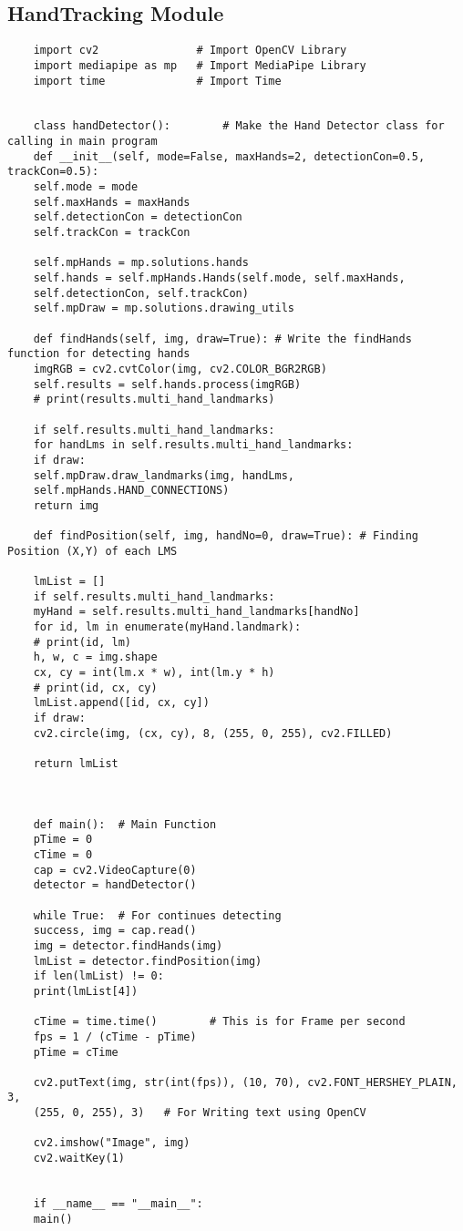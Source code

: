\subsection{HandTracking Module}
\begin{verbatim}
	import cv2               # Import OpenCV Library
	import mediapipe as mp   # Import MediaPipe Library
	import time              # Import Time
	
	
	class handDetector():        # Make the Hand Detector class for calling in main program
	def __init__(self, mode=False, maxHands=2, detectionCon=0.5, trackCon=0.5):
	self.mode = mode
	self.maxHands = maxHands
	self.detectionCon = detectionCon
	self.trackCon = trackCon
	
	self.mpHands = mp.solutions.hands
	self.hands = self.mpHands.Hands(self.mode, self.maxHands,
	self.detectionCon, self.trackCon)
	self.mpDraw = mp.solutions.drawing_utils
	
	def findHands(self, img, draw=True): # Write the findHands function for detecting hands
	imgRGB = cv2.cvtColor(img, cv2.COLOR_BGR2RGB)
	self.results = self.hands.process(imgRGB)
	# print(results.multi_hand_landmarks)
	
	if self.results.multi_hand_landmarks:
	for handLms in self.results.multi_hand_landmarks:
	if draw:
	self.mpDraw.draw_landmarks(img, handLms,
	self.mpHands.HAND_CONNECTIONS)
	return img
	
	def findPosition(self, img, handNo=0, draw=True): # Finding Position (X,Y) of each LMS
	
	lmList = []
	if self.results.multi_hand_landmarks:
	myHand = self.results.multi_hand_landmarks[handNo]
	for id, lm in enumerate(myHand.landmark):
	# print(id, lm)
	h, w, c = img.shape
	cx, cy = int(lm.x * w), int(lm.y * h)
	# print(id, cx, cy)
	lmList.append([id, cx, cy])
	if draw:
	cv2.circle(img, (cx, cy), 8, (255, 0, 255), cv2.FILLED)
	
	return lmList
	
	
	
	def main():  # Main Function
	pTime = 0
	cTime = 0
	cap = cv2.VideoCapture(0)
	detector = handDetector()
	
	while True:  # For continues detecting
	success, img = cap.read()
	img = detector.findHands(img)
	lmList = detector.findPosition(img)
	if len(lmList) != 0:
	print(lmList[4])
	
	cTime = time.time()        # This is for Frame per second
	fps = 1 / (cTime - pTime) 
	pTime = cTime
	
	cv2.putText(img, str(int(fps)), (10, 70), cv2.FONT_HERSHEY_PLAIN, 3,
	(255, 0, 255), 3)   # For Writing text using OpenCV
	
	cv2.imshow("Image", img)
	cv2.waitKey(1)
	
	
	if __name__ == "__main__":
	main()
	
\end{verbatim}

